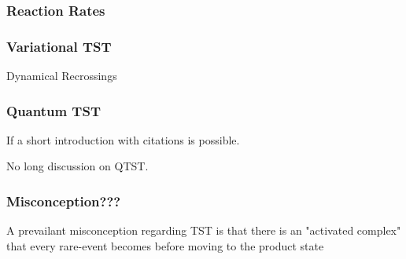 \subsubsection{Reaction Rates}
\placeholder

\subsubsection{Variational TST}
\bit
\item Dynamical Recrossings
\eit

\subsubsection{Quantum TST}
\bit
\item If a short introduction with citations is possible.
\item No long discussion on QTST.
\eit

\subsubsection{Misconception???}
A prevailant misconception regarding TST is that there is an "activated complex" that every rare-event becomes before moving to the product state

\placeholder

